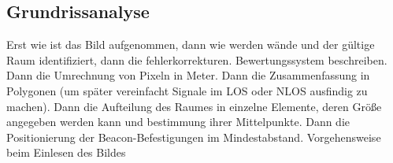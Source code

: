 \subsection{Grundrissanalyse}

Erst wie ist das Bild aufgenommen, dann wie werden wände und der gültige Raum identifiziert, dann die fehlerkorrekturen. Bewertungssystem beschreiben. Dann die Umrechnung von Pixeln in Meter. Dann die Zusammenfassung in Polygonen (um später vereinfacht Signale im LOS oder NLOS ausfindig zu machen). Dann die Aufteilung des Raumes in einzelne Elemente, deren Größe angegeben werden kann und bestimmung ihrer Mittelpunkte. Dann die Positionierung der Beacon-Befestigungen im Mindestabstand.
Vorgehensweise beim Einlesen des Bildes


